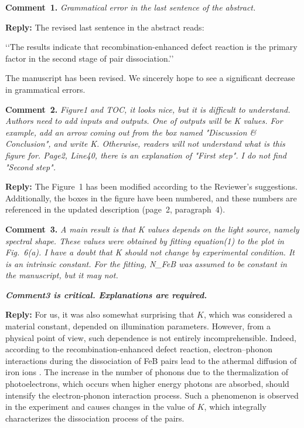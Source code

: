 \documentclass{WileyMSP-template}
\begin{document}
\noindent
\textcolor[rgb]{0.00,0.50,1.00}{\textbf{Comment~1.}}
\emph{Grammatical error in the last sentence of the abstract.}


\noindent
\textcolor[rgb]{0.51,0.00,0.00}{\textbf{Reply:}}
The revised last sentence in the abstract reads:

‘‘The results indicate that recombination-enhanced defect reaction is the primary factor in the second stage of pair dissociation.’’

The manuscript has been revised.
We sincerely hope to see a significant decrease in grammatical errors.



\vspace{1cm}
\noindent
\textcolor[rgb]{0.00,0.50,1.00}{\textbf{Comment~2.}}
\emph{Figure1 and TOC, it looks nice, but it is difficult to understand.
Authors need to add inputs and outputs.
One of outputs will be K values.
For example, add an arrow coming out from the box named "Discussion \& Conclusion",
and write K.
Otherwise, readers will not understand what is this figure for.
Page2, Line40, there is an explanation of "First step".
I do not find "Second step".}

\noindent
\textcolor[rgb]{0.51,0.00,0.00}{\textbf{Reply:}}
The Figure~1 has been modified according to the Reviewer’s suggestions.
Additionally, the boxes in the figure have been numbered,
and these numbers are referenced in the updated description
(page~2, paragraph~4).


\vspace{1cm}
\noindent
\textcolor[rgb]{0.00,0.50,1.00}{\textbf{Comment~3.}}
\emph{A main result is that K values depends on the light source, namely spectral shape.
These values were obtained by fitting equation(1) to the plot in Fig.~6(a).
I have a doubt that K should not change by experimental condition.
It is an intrinsic constant.
For the fitting, N\_FeB was assumed to be constant in the manuscript, but it may not.}

\emph{
\textbf{Comment3 is critical. Explanations are required.}
}

\noindent
\textcolor[rgb]{0.51,0.00,0.00}{\textbf{Reply:}}
For us, it was also somewhat surprising that $K$,
which was considered a material constant, depended on illumination parameters.
However, from a physical point of view, such dependence is not entirely incomprehensible.
Indeed, according to the recombination-enhanced defect reaction,
electron--phonon interactions during the dissociation of FeB pairs lead to the athermal diffusion of iron ions \cite{FeBKin2019,KIMERLINGFeB}.
The increase in the number of phonons due to the thermalization of photoelectrons,
which occurs when higher energy photons are absorbed,
should intensify the electron-phonon interaction process.
Such a phenomenon is observed in the experiment and causes changes in the value of $K$,
which integrally characterizes the dissociation process of the pairs.
\end{document}
